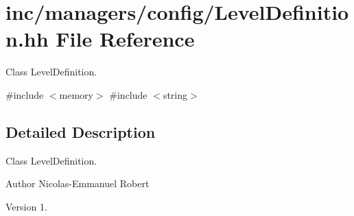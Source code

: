 \hypertarget{LevelDefinition_8hh}{}\section{inc/managers/config/\+Level\+Definition.hh File Reference}
\label{LevelDefinition_8hh}


Class Level\+Definition.  


{\ttfamily \#include $<$memory$>$}\newline
{\ttfamily \#include $<$string$>$}\newline


\subsection{Detailed Description}
Class Level\+Definition. 

\begin{DoxyAuthor}{Author}
Nicolas-\/\+Emmanuel Robert 
\end{DoxyAuthor}
\begin{DoxyVersion}{Version}
1. 
\end{DoxyVersion}
